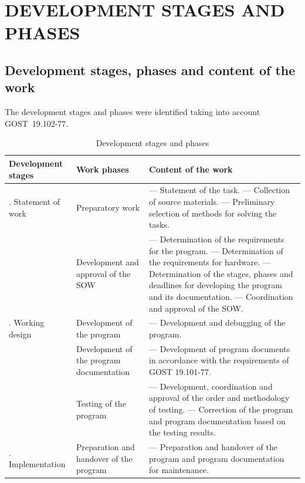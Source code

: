 \documentclass[12pt,a4paper]{extarticle}
\begin{document}
\section{DEVELOPMENT STAGES AND PHASES}

\subsection{Development stages, phases and content of the work}

The development stages and phases were identified taking into account GOST~19.102-77\cite{gost19102}.

\begin{table}[H]
\caption{Development stages and phases}
\label{tab:stages}
\small
\begin{tabularx}{\textwidth}{|>{\raggedright\arraybackslash}p{3.5cm}|>{\raggedright\arraybackslash}p{3.5cm}|>{\raggedright\arraybackslash}X|}
\hline
\textbf{Development stages} & \textbf{Work phases} & \textbf{Content of the work} \\
\hline
1. Statement of work & Preparatory work & --- Statement of the task.\newline
--- Collection of source materials.\newline
--- Preliminary selection of methods for solving the tasks. \\
\hline
& Development and approval of the SOW & --- Determination of the requirements for the program.\newline
--- Determination of the requirements for hardware.\newline
--- Determination of the stages, phases and deadlines for developing the program and its documentation.\newline
--- Coordination and approval of the SOW. \\
\hline
2. Working design & Development of the program & --- Development and debugging of the program. \\
\hline
& Development of the program documentation & --- Development of program documents in accordance with the requirements of GOST 19.101-77\cite{gost19101}. \\
\hline
& Testing of the program & --- Development, coordination and approval of the order and methodology of testing.\newline
--- Correction of the program and program documentation based on the testing results. \\
\hline
3. Implementation & Preparation and handover of the program & --- Preparation and handover of the program and program documentation for maintenance. \\
\hline
\end{tabularx}
\end{table}
\end{document}
